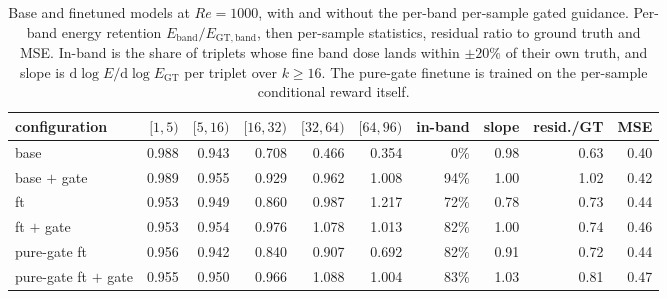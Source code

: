 \begin{table}[H]
  \centering
  \caption{Base and finetuned models at $Re{=}1000$, with and without the per-band per-sample gated guidance. Per-band energy retention $E_{\mathrm{band}}/E_{\mathrm{GT,band}}$, then per-sample statistics, residual ratio to ground truth and MSE. In-band is the share of triplets whose fine band dose lands within $\pm20\%$ of their own truth, and slope is $\mathrm{d}\log E/\mathrm{d}\log E_{\mathrm{GT}}$ per triplet over $k\geq16$. The pure-gate finetune is trained on the per-sample conditional reward itself.}
  \label{tab:re1k-gate-models}
  \begin{tabular}{lrrrrrrrrr}
    \toprule
    configuration & $[1,5)$ & $[5,16)$ & $[16,32)$ & $[32,64)$ & $[64,96)$ & in-band & slope & resid./GT & MSE \\
    \midrule
    base & 0.988 & 0.943 & 0.708 & 0.466 & 0.354 & 0\% & 0.98 & 0.63 & 0.40 \\
    base $+$ gate & 0.989 & 0.955 & 0.929 & 0.962 & 1.008 & 94\% & 1.00 & 1.02 & 0.42 \\
    \midrule
    ft & 0.953 & 0.949 & 0.860 & 0.987 & 1.217 & 72\% & 0.78 & 0.73 & 0.44 \\
    ft $+$ gate & 0.953 & 0.954 & 0.976 & 1.078 & 1.013 & 82\% & 1.00 & 0.74 & 0.46 \\
    \midrule
    pure-gate ft & 0.956 & 0.942 & 0.840 & 0.907 & 0.692 & 82\% & 0.91 & 0.72 & 0.44 \\
    pure-gate ft $+$ gate & 0.955 & 0.950 & 0.966 & 1.088 & 1.004 & 83\% & 1.03 & 0.81 & 0.47 \\
    \bottomrule
  \end{tabular}
\end{table}
